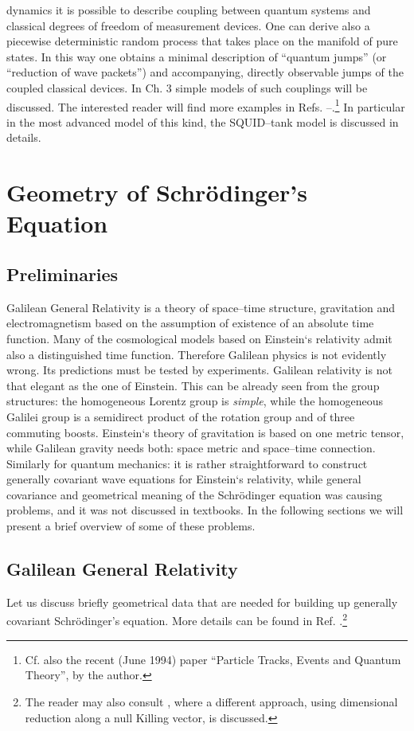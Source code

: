 \documentclass[12pt]{article}
\begin{document}
dynamics it is possible to describe coupling between quantum
systems and classical degrees of freedom of measurement devices. 
One can derive also a piecewise deterministic random process
that takes place on the manifold of pure states.  In  this way
one obtains a minimal description of ``quantum jumps''  (or
``reduction of wave packets'') and accompanying,  directly
observable jumps of the coupled classical devices.  In Ch.  3
simple models of such couplings will be discussed.  The
interested reader will find more examples in Refs. 
\cite{bla2}--\cite{bla5}.\footnote{Cf. also the recent (June 1994) paper ``Particle Tracks,
Events and Quantum Theory'', by the author.}
In particular in \cite{bla5} the most
advanced model of this kind,  the SQUID--tank
model is discussed in details.
\section{Geometry of Schr\"odinger's Equation}
\subsection{Preliminaries}
Galilean General Relativity is a theory of space--time
structure,  gravitation and electromagnetism based on the
assumption of existence of an absolute time function.  Many of the
cosmological models based on Einstein`s relativity admit also a 
distinguished time function.  Therefore Galilean physics is not
evidently wrong.  Its predictions must be tested by experiments. 
Galilean relativity is not
that elegant as the one of Einstein.  This can be already seen
from the group structures:  the homogeneous Lorentz group is
{\sl simple},  while the homogeneous Galilei group is a semidirect
product of the rotation group and of three commuting boosts.
Einstein`s theory of gravitation is based on one metric tensor, 
while Galilean gravity needs both:  space metric and space--time
connection.  Similarly for quantum mechanics:  it is rather
straightforward to construct generally covariant wave equations
for Einstein`s relativity,  while general covariance and
geometrical meaning of the Schr\"{o}dinger equation was causing
problems,  and it was not discussed in textbooks.  In the
following sections we will present a brief overview of some
of these problems. 
\subsection{Galilean General Relativity}
Let us discuss briefly geometrical data that are needed for building up
generally covariant Schr\"odinger's equation.  More details can be
found in Ref. \cite{jamo}.\footnote{The reader may also consult \cite{duv}, 
where a different approach,  using dimensional reduction along a
null Killing vector,  is discussed.  }
\end{document}
